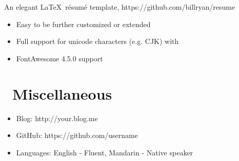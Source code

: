 \documentclass{resume}
\begin{document}
An elegant \LaTeX\ résumé template, https://github.com/billryan/resume
\begin{itemize}
  \item Easy to be further customized or extended
  \item Full support for unicode characters (e.g. CJK) with \XeLaTeX\
  \item FontAwesome 4.5.0 support
\end{itemize}




\section{\faInfo\ Miscellaneous}
\begin{itemize}[parsep=0.5ex]
  \item Blog: http://your.blog.me
  \item GitHub: https://github.com/username
  \item Languages: English - Fluent, Mandarin - Native speaker
\end{itemize}

%
%
\end{document}

